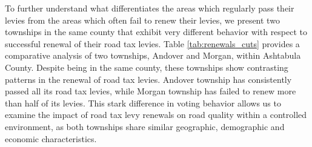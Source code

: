 To further understand what differentiates the areas which regularly pass their levies from the areas which often fail to renew their levies, we present two townships in the same county that exhibit very different behavior with respect to successful renewal of their road tax levies. Table \ref{tab:renewals_cuts} provides a comparative analysis of two townships, Andover and Morgan, within Ashtabula County. Despite being in the same county, these townships show contrasting patterns in the renewal of road tax levies. Andover township has consistently passed all its road tax levies, while Morgan township has failed to renew more than half of its levies. This stark difference in voting behavior allows us to examine the impact of road tax levy renewals on road quality within a controlled environment, as both townships share similar geographic,  demographic and economic characteristics.

